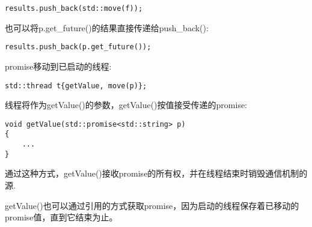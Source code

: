 \begin{lstlisting}[caption={}]
results.push_back(std::move(f));
\end{lstlisting}

也可以将p.get\_future()的结果直接传递给push\_back():\par

\begin{lstlisting}[caption={}]
results.push_back(p.get_future());
\end{lstlisting}

promise移动到已启动的线程:\par

\begin{lstlisting}[caption={}]
std::thread t{getValue, move(p)};
\end{lstlisting}

线程将作为getValue()的参数，getValue()按值接受传递的promise:\par

\begin{lstlisting}[caption={}]
void getValue(std::promise<std::string> p)
{
	...
}
\end{lstlisting}

通过这种方式，getValue()接收promise的所有权，并在线程结束时销毁通信机制的源.\par

getValue()也可以通过引用的方式获取promise，因为启动的线程保存着已移动的promise值，直到它结束为止。\par














